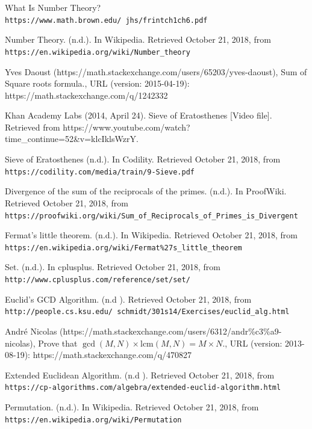 \documentclass[12pt]{article}
\begin{document}
\begin{thebibliography}{9}
What Is Number Theory?
\\\texttt{https://www.math.brown.edu/~jhs/frintch1ch6.pdf}

Number Theory. (n.d.). In Wikipedia. Retrieved October 21, 2018, from \texttt{https://en.wikipedia.org/wiki/Number\_theory}

Yves Daoust (https://math.stackexchange.com/users/65203/yves-daoust), Sum of Square roots formula., URL (version: 2015-04-19): https://math.stackexchange.com/q/1242332

Khan Academy Labs (2014, April 24). Sieve of Eratosthenes [Video file]. Retrieved from https://www.youtube.com/watch?time\_continue=52\&v=klcIklsWzrY.

Sieve of Eratosthenes (n.d.). In Codility. Retrieved October 21, 2018, from \texttt{https://codility.com/media/train/9-Sieve.pdf}

Divergence of the sum of the reciprocals of the primes. (n.d.). In ProofWiki. Retrieved October 21, 2018, from \texttt{https://proofwiki.org/wiki/Sum\_of\_Reciprocals\_of\_Primes\_is\_Divergent}

Fermat's little theorem. (n.d.). In Wikipedia. Retrieved October 21, 2018, from \texttt{https://en.wikipedia.org/wiki/Fermat\%27s\_little\_theorem}


Set. (n.d.). In cplusplus. Retrieved October 21, 2018, from \texttt{ http://www.cplusplus.com/reference/set/set/ }

Euclid's GCD Algorithm. (n.d ). Retrieved October 21, 2018, from \texttt{ http://people.cs.ksu.edu/~schmidt/301s14/Exercises/euclid\_alg.html }

André Nicolas (https://math.stackexchange.com/users/6312/andr\%c3\%a9-nicolas), Prove that $\gcd(M, N)\times \mbox{lcm}(M, N) = M \times N$., URL (version: 2013-08-19): https://math.stackexchange.com/q/470827


Extended Euclidean Algorithm. (n.d ). Retrieved October 21, 2018, from \texttt{ https://cp-algorithms.com/algebra/extended-euclid-algorithm.html }

Permutation. (n.d.). In Wikipedia. Retrieved October 21, 2018, from \texttt{https://en.wikipedia.org/wiki/Permutation}


\end{thebibliography}
\end{document}
